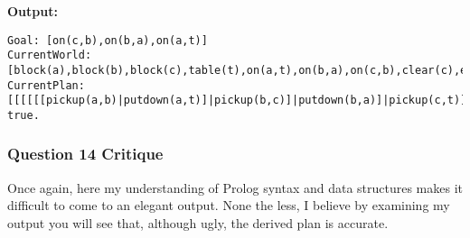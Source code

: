 \documentclass[11pt]{article}
\begin{document}
\textbf{Output:}

\begin{verbatim}
Goal: [on(c,b),on(b,a),on(a,t)]
CurrentWorld: [block(a),block(b),block(c),table(t),on(a,t),on(b,a),on(c,b),clear(c),empty]
CurrentPlan: [[[[[[pickup(a,b)|putdown(a,t)]|pickup(b,c)]|putdown(b,a)]|pickup(c,t)]|putdown(c,b)]]
true.
\end{verbatim}

    \hypertarget{question-14-critique}{%
\subsubsection{Question 14 Critique}\label{question-14-critique}}

Once again, here my understanding of Prolog syntax and data structures
makes it difficult to come to an elegant output. None the less, I
believe by examining my output you will see that, although ugly, the
derived plan is accurate.


    
    
    
    
\end{document}
